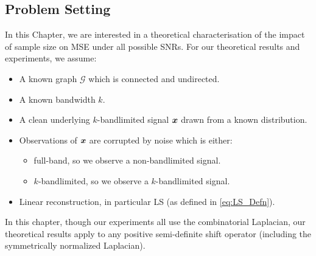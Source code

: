 \subsection{Problem Setting}
\label{sec:signal_model}
In this Chapter, we are interested in a theoretical characterisation of the impact of sample size on MSE under all possible SNRs. 
For our theoretical results and experiments, we assume:
\begin{itemize}
    \item A known graph $\mathcal{G}$ which is connected and undirected.
    \item A known bandwidth $k$.
    \item A clean underlying $k$-bandlimited signal $\bm{x}$ drawn from a known distribution.
    \item Observations of $\bm{x}$ are corrupted by noise which is either:
    \begin{itemize}
        \item full-band, so we observe a non-bandlimited signal.
        \item $k$-bandlimited, so we observe a $k$-bandlimited signal.
    \end{itemize}
    \item Linear reconstruction, in particular LS (as defined in \eqref{eq:LS_Defn}).
\end{itemize}

In this chapter, though our experiments all use the combinatorial Laplacian, our theoretical results apply to any positive semi-definite shift operator (including the symmetrically normalized Laplacian).


